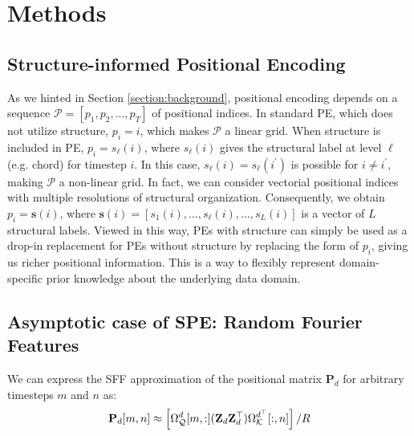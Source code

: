 \section{Methods} \label{section:methods}

\subsection{Structure-informed Positional Encoding}

As we hinted in Section \ref{section:background}, positional encoding depends on a sequence $\mathcal{P} = [ p_1, p_2, ... , p_T ]$ of positional indices. In standard PE, which does not utilize structure, $p_i = i$, which makes $\mathcal{P}$ a linear grid. When structure is included in PE, $p_i = s_\ell (i)$, where $s_\ell (i)$ gives the structural label at level $\ell$ (e.g. chord) for timestep $i$. In this case, $s_\ell (i) = s_\ell (i^{\prime})$ is possible for $i \neq i^{\prime}$, making $\mathcal{P}$ a non-linear grid. In fact, we can consider vectorial positional indices with multiple resolutions of structural organization. Consequently, we obtain $p_i = \mathbf{s} (i)$, where $\mathbf{s} (i) = [ s_1 (i) , ..., s_\ell (i), ..., s_L (i) ]$ is a vector of $L$ structural labels. Viewed in this way, PEs with structure can simply be used as a drop-in replacement for PEs without structure by replacing the form of $p_i$, giving us richer positional information. This is a way to flexibly represent domain-specific prior knowledge about the underlying data domain.

\subsection{Asymptotic case of SPE: Random Fourier Features} \label{ssection:asymptotic_rff}

We can express the SFF approximation of the positional matrix $\mathbf{P}_d$ for arbitrary timesteps $m$ and $n$ as:
\begin{equation} \label{eq:sff_mn}
    \mathbf{P}_d[m, n] \approx \left[ \Omega_\mathcal{Q}^d [m, :] (\mathbf{Z}_d \mathbf{Z}_d^\top) \Omega_\mathcal{K}^{d^\top} [:, n] \right] / R \\
\end{equation}

